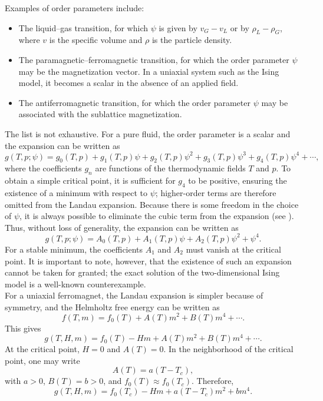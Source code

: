 \documentclass[a4paper]{article}
\begin{document}
Examples of order parameters include:
\begin{itemize}
\item The liquid--gas transition, for which $\psi$ is given by $v_G-v_L$ or by $\rho_L-\rho_G$, where $v$ is the specific volume and $\rho$ is the particle density.
\item The paramagnetic--ferromagnetic transition, for which the order parameter $\psi$ may be the magnetization vector. In a uniaxial system such as the Ising model, it becomes a scalar in the absence of an applied field.
\item The antiferromagnetic transition, for which the order parameter $\psi$ may be associated with the sublattice magnetization.
\end{itemize}
The list is not exhaustive. For a pure fluid, the order parameter is a scalar and the expansion can be written as
\begin{equation}
g(T,p;\psi)=g_0(T,p)+g_1(T,p)\psi+g_2(T,p)\psi^2+g_3(T,p)\psi^3+g_4(T,p)\psi^4+\cdots,
\end{equation}
where the coefficients $g_n$ are functions of the thermodynamic fields $T$ and $p$. To obtain a simple critical point, it is sufficient for $g_4$ to be positive, ensuring the existence of a minimum with respect to $\psi$; higher-order terms are therefore omitted from the Landau expansion. Because there is some freedom in the choice of $\psi$, it is always possible to eliminate the cubic term from the expansion (see \cite{Salinas}). Thus, without loss of generality, the expansion can be written as
\begin{equation}
g(T,p;\psi)=A_0(T,p)+A_1(T,p)\psi+A_2(T,p)\psi^2+\psi^4.
\end{equation}
For a stable minimum, the coefficients $A_1$ and $A_2$ must vanish at the critical point. It is important to note, however, that the existence of such an expansion cannot be taken for granted; the exact solution of the two-dimensional Ising model is a well-known counterexample.\\

For a uniaxial ferromagnet, the Landau expansion is simpler because of symmetry, and the Helmholtz free energy can be written as
\begin{equation}
f(T,m)=f_0(T)+A(T)m^2+B(T)m^4+\cdots.
\end{equation}
This gives
\begin{equation}
g(T,H,m)=f_0(T)-Hm+A(T)m^2+B(T)m^4+\cdots.
\end{equation}
At the critical point, $H=0$ and $A(T)=0$. In the neighborhood of the critical point, one may write
\begin{equation}
A(T)=a(T-T_c),
\end{equation}
with $a>0$, $B(T)=b>0$, and $f_0(T)\approx f_0(T_c)$. Therefore,
\begin{equation}
g(T,H,m)=f_0(T_c)-Hm+a(T-T_c)m^2+bm^4.
\end{equation}
\end{document}
